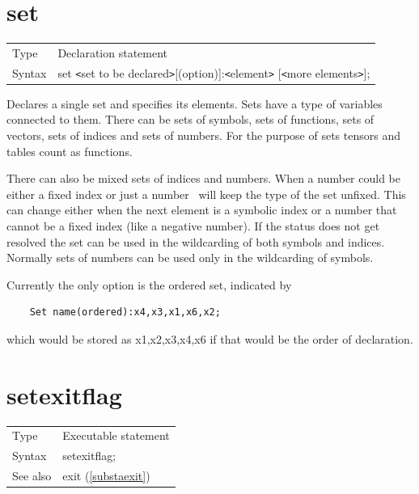 
\section{set}
\label{substaset}

\noindent \begin{tabular}{ll}
Type & Declaration statement\\
Syntax & set {\tt<}set to be declared{\tt>}[(option)]:{\tt<}element{\tt>} [{\tt<}more elements{\tt>}];
\end{tabular} \vspace{4mm}

\noindent Declares a single set and specifies its 
elements. Sets have a type of variables connected to them. 
There can be sets of symbols, sets of functions, sets of vectors, sets of 
indices and sets of numbers. For the purpose of sets tensors 
and tables count as functions.

\noindent There can also be mixed sets of indices and 
numbers. When a number could be either a fixed index or just a number \FORM\ 
will keep the type of the set unfixed. This can change either when the next 
element is a symbolic index or a number that cannot be a fixed index (like 
a negative number). If the status does not get resolved the set can be used 
in the wildcarding of both symbols and indices. Normally sets of numbers 
can be used only in the wildcarding of symbols.

Currently the only option is the ordered 
set, indicated by
\begin{verbatim}
    Set name(ordered):x4,x3,x1,x6,x2;
\end{verbatim}
which would be stored as x1,x2,x3,x4,x6 if that would be the order of 
declaration.

\vspace{10mm}


\section{setexitflag}
\label{substasetexitflag}

\noindent \begin{tabular}{ll}
Type & Executable statement\\
Syntax & setexitflag;
\\ See also & exit (\ref{substaexit})
\end{tabular} \vspace{4mm}

